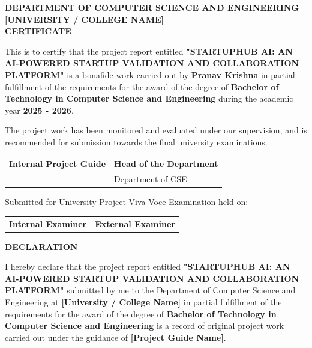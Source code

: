 \documentclass[12pt,a4paper]{report}
\begin{document}
\newpage
\thispagestyle{empty}
\begin{center}
    \large
    \textbf{DEPARTMENT OF COMPUTER SCIENCE AND ENGINEERING} \\
    \textbf{[UNIVERSITY / COLLEGE NAME]} \\
    \vspace{0.5cm}
    \textbf{CERTIFICATE}
\end{center}
\vspace{1cm}
This is to certify that the project report entitled \textbf{"STARTUPHUB AI: AN AI-POWERED STARTUP VALIDATION AND COLLABORATION PLATFORM"} is a bonafide work carried out by \textbf{Pranav Krishna} in partial fulfillment of the requirements for the award of the degree of \textbf{Bachelor of Technology in Computer Science and Engineering} during the academic year \textbf{2025 - 2026}.

The project work has been monitored and evaluated under our supervision, and is recommended for submission towards the final university examinations.

\vspace{3cm}

\noindent
\begin{tabular}{@{}p{3in}p{3in}@{}}
    \textbf{Internal Project Guide} & \textbf{Head of the Department} \\
    [Designation / Department] & Department of CSE
\end{tabular}

\vspace{2cm}
\noindent
Submitted for University Project Viva-Voce Examination held on: \hrulefill

\vspace{2cm}
\noindent
\begin{tabular}{@{}p{3in}p{3in}@{}}
    \textbf{Internal Examiner} & \textbf{External Examiner}
\end{tabular}

\newpage
\thispagestyle{empty}
\begin{center}
    \large
    \textbf{DECLARATION}
\end{center}
\vspace{1.5cm}
I hereby declare that the project report entitled \textbf{"STARTUPHUB AI: AN AI-POWERED STARTUP VALIDATION AND COLLABORATION PLATFORM"} submitted by me to the Department of Computer Science and Engineering at \textbf{[University / College Name]} in partial fulfillment of the requirements for the award of the degree of \textbf{Bachelor of Technology in Computer Science and Engineering} is a record of original project work carried out under the guidance of \textbf{[Project Guide Name]}.
\end{document}
